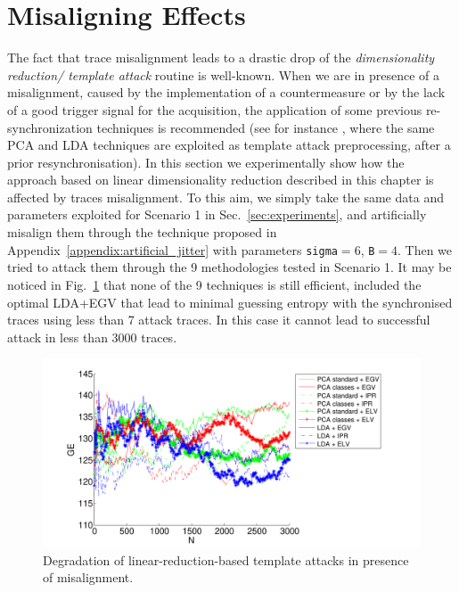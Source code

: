 \section{Misaligning Effects}\label{sec:misalignment}
The fact that trace misalignment leads to a drastic drop of the \emph{dimensionality reduction/ template attack} routine is well-known. When we are in presence of a misalignment, caused by the implementation of a countermeasure or  by the lack of a good trigger signal for the acquisition, the application of some previous re-synchronization techniques is recommended (see for instance \cite{choudary2014template}, where the same PCA and LDA techniques are exploited as template attack preprocessing, after a prior resynchronisation). In this section we experimentally show how the approach based on linear dimensionality reduction described in this chapter is affected by traces misalignment. To this aim, we simply take the same data and parameters exploited for Scenario 1 in Sec.~\ref{sec:experiments}, and artificially misalign them through the technique proposed in Appendix~\ref{appendix:artificial_jitter} with parameters \texttt{sigma}$= 6$, \texttt{B}$= 4$. Then we tried to attack them through the 9 methodologies tested in Scenario 1. It may be noticed in Fig.~\ref{fig:PCA_LDA_misalignment} that none of the 9 techniques is still efficient, included the optimal LDA+EGV that lead to minimal guessing entropy with the synchronised traces using less than 7 attack traces. In this case it cannot lead to successful attack in less than 3000 traces.
\begin{figure}
\includegraphics[width=\textwidth]{../Figures/desynchro_results_PCA_LDA.pdf} 
\caption{Degradation of linear-reduction-based template attacks in presence of misalignment.}\label{fig:PCA_LDA_misalignment}
\end{figure}